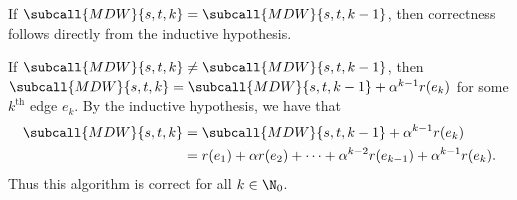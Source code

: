 \documentclass{article}
\begin{document}
\begin{solution}
\begin{subproof}[Correctness.]
 If $\subcall{MDW}{s,t,k}=\subcall{MDW}{s,t,k-1}$, then correctness follows directly from the inductive hypothesis.

 If $\subcall{MDW}{s,t,k}\neq \subcall{MDW}{s,t,k-1}$, then $\subcall{MDW}{s,t,k}=\subcall{MDW}{s,t,k-1}+\alpha^{k-1}r(e_k)$ for some $k^{\text{th}}$ edge $e_k$. By the inductive hypothesis, we have that \begin{align*}
\subcall{MDW}{s,t,k}&=\subcall{MDW}{s,t,k-1}+\alpha^{k-1}r(e_k) \\
&= r(e_1) + \alpha r(e_2)+ \cdots + \alpha^{k-2} r(e_{k-1}) +\alpha^{k-1}r(e_k).
\end{align*}
Thus this algorithm is correct for all $k\in \N_0$.
\end{subproof}
\end{solution}
\end{document}
